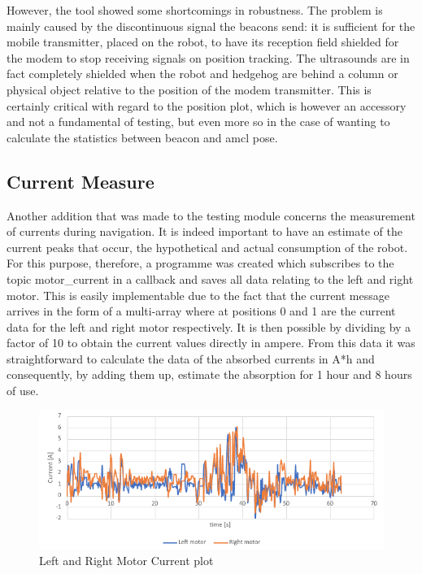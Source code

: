 However, the tool showed some shortcomings in robustness. The problem is mainly caused by the discontinuous signal the beacons send: it is sufficient for the mobile transmitter, placed on the robot, to have its reception field shielded for the modem to stop receiving signals on position tracking. The ultrasounds are in fact completely shielded when the robot and hedgehog are behind a column or physical object relative to the position of the modem transmitter. This is certainly critical with regard to the position plot, which is however an accessory and not a fundamental of testing, but even more so in the case of wanting to calculate the statistics between beacon and amcl pose. 


\subsection{Current Measure}
Another addition that was made to the testing module concerns the measurement of currents during navigation. It is indeed important to have an estimate of the current peaks that occur, the hypothetical and actual consumption of the robot. For this purpose, therefore, a programme was created which subscribes to the topic motor\_current in a callback and saves all data relating to the left and right motor. This is easily implementable due to the fact that the current message arrives in the form of a multi-array where at positions 0 and 1 are the current data for the left and right motor respectively. It is then possible by dividing by a factor of 10 to obtain the current values directly in ampere. From this data it was straightforward to calculate the data of the absorbed currents in A*h and consequently, by adding them up, estimate the absorption for 1 hour and 8 hours of use.
\begin{figure}[H]
    \centering
    \includegraphics[scale=0.7]{Images/Chapter 5/motorcurrent.png}
    \caption{Left and Right Motor Current plot}
    \label{fig:motorcurrent}
\end{figure}

